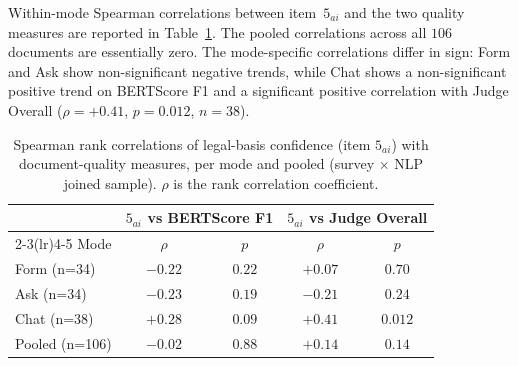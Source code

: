 Within-mode Spearman correlations between item~$5_{ai}$ and the two quality
measures are reported in Table~\ref{tab:conf-quality-corr}. The pooled
correlations across all $106$ documents are essentially zero. The
mode-specific correlations differ in sign: Form and Ask show non-significant
negative trends, while Chat shows a non-significant positive trend on
BERTScore F1 and a significant positive correlation with Judge Overall
($\rho = +0.41$, $p = 0.012$, $n = 38$).

\begin{table}[htbp]
\centering
\caption{Spearman rank correlations of legal-basis confidence (item
$5_{ai}$) with document-quality measures, per mode and pooled (survey
$\times$ NLP joined sample). $\rho$ is the rank correlation coefficient.}
\label{tab:conf-quality-corr}
\begin{tabular}{@{}l c c c c@{}}
\toprule
& \multicolumn{2}{c}{$5_{ai}$ vs BERTScore F1} & \multicolumn{2}{c}{$5_{ai}$ vs Judge Overall} \\
\cmidrule(lr){2-3}\cmidrule(lr){4-5}
Mode & $\rho$ & $p$ & $\rho$ & $p$ \\
\midrule
Form (n=34) & $-0.22$ & $0.22$ & $+0.07$ & $0.70$ \\
Ask  (n=34) & $-0.23$ & $0.19$ & $-0.21$ & $0.24$ \\
Chat (n=38) & $+0.28$ & $0.09$ & $+0.41$ & $0.012$ \\
Pooled (n=106) & $-0.02$ & $0.88$ & $+0.14$ & $0.14$ \\
\bottomrule
\end{tabular}
\end{table}
